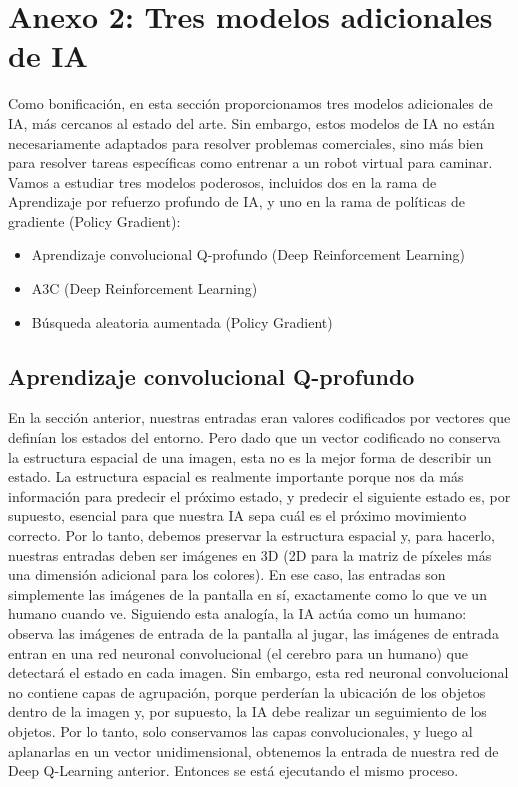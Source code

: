 \documentclass[
]{book}
\providecommand{\tightlist}{%
  \setlength{\itemsep}{0pt}\setlength{\parskip}{0pt}}
\begin{document}
\hypertarget{anexo-2-tres-modelos-adicionales-de-ia}{%
\section{Anexo 2: Tres modelos adicionales de IA}\label{anexo-2-tres-modelos-adicionales-de-ia}}

Como bonificación, en esta sección proporcionamos tres modelos adicionales de IA, más cercanos al estado del arte. Sin embargo, estos modelos de IA no están necesariamente adaptados para resolver problemas comerciales, sino más bien para resolver tareas específicas como entrenar a un robot virtual para caminar. Vamos a estudiar tres modelos poderosos, incluidos dos en la rama de Aprendizaje por refuerzo profundo de IA, y uno en la rama de políticas de gradiente (Policy Gradient):

\begin{itemize}
\tightlist
\item
  Aprendizaje convolucional Q-profundo (Deep Reinforcement Learning)
\item
  A3C (Deep Reinforcement Learning)
\item
  Búsqueda aleatoria aumentada (Policy Gradient)
\end{itemize}

\hypertarget{aprendizaje-convolucional-q-profundo}{%
\subsection{Aprendizaje convolucional Q-profundo}\label{aprendizaje-convolucional-q-profundo}}

En la sección anterior, nuestras entradas eran valores codificados por vectores que definían los estados del entorno. Pero dado que un vector codificado no conserva la estructura espacial de una imagen, esta no es la mejor forma de describir un estado. La estructura espacial es realmente importante porque nos da más información para predecir el próximo estado, y predecir el siguiente estado es, por supuesto, esencial para que nuestra IA sepa cuál es el próximo movimiento correcto. Por lo tanto, debemos preservar la estructura espacial y, para hacerlo, nuestras entradas deben ser imágenes en 3D (2D para la matriz de píxeles más una dimensión adicional para los colores). En ese caso, las entradas son simplemente las imágenes de la pantalla en sí, exactamente como lo que ve un humano cuando ve. Siguiendo esta analogía, la IA actúa como un humano: observa las imágenes de entrada de la pantalla al jugar, las imágenes de entrada entran en una red neuronal convolucional (el cerebro para un humano) que detectará el estado en cada imagen. Sin embargo, esta red neuronal convolucional no contiene capas de agrupación, porque perderían la ubicación de los objetos dentro de la imagen y, por supuesto, la IA debe realizar un seguimiento de los objetos. Por lo tanto, solo conservamos las capas convolucionales, y luego al aplanarlas en un vector unidimensional, obtenemos la entrada de nuestra red de Deep Q-Learning anterior. Entonces se está ejecutando el mismo proceso.
\end{document}
